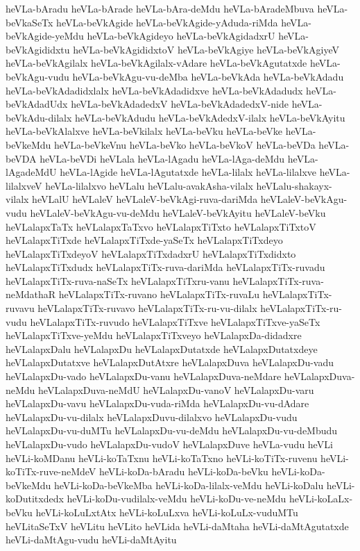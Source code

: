 {heVLa-bAradu
heVLa-bArade
heVLa-bAra-deMdu
heVLa-bAradeMbuva
heVLa-beVkaSeTx
heVLa-beVkAgide
heVLa-beVkAgide-yAduda-riMda
heVLa-beVkAgide-yeMdu
heVLa-beVkAgideyo
heVLa-beVkAgidadxrU
heVLa-beVkAgididxtu
heVLa-beVkAgididxtoV
heVLa-beVkAgiye
heVLa-beVkAgiyeV
heVLa-beVkAgilalx
heVLa-beVkAgilalx-vAdare
heVLa-beVkAgutatxde
heVLa-beVkAgu-vudu
heVLa-beVkAgu-vu-deMba
heVLa-beVkAda
heVLa-beVkAdadu
heVLa-beVkAdadidxlalx
heVLa-beVkAdadidxve
heVLa-beVkAdadudx
heVLa-beVkAdadUdx
heVLa-beVkAdadedxV
heVLa-beVkAdadedxV-nide
heVLa-beVkAdu-dilalx
heVLa-beVkAdudu
heVLa-beVkAdedxV-ilalx
heVLa-beVkAyitu
heVLa-beVkAlalxve
heVLa-beVkilalx
heVLa-beVku
heVLa-beVke
heVLa-beVkeMdu
heVLa-beVkeVnu
heVLa-beVko
heVLa-beVkoV
heVLa-beVDa
heVLa-beVDA
heVLa-beVDi
heVLala
heVLa-lAgadu
heVLa-lAga-deMdu
heVLa-lAgadeMdU
heVLa-lAgide
heVLa-lAgutatxde
heVLa-lilalx
heVLa-lilalxve
heVLa-lilalxveV
heVLa-lilalxvo
heVLalu
heVLalu-avakAsha-vilalx
heVLalu-shakayx-vilalx
heVLalU
heVLaleV
heVLaleV-beVkAgi-ruva-dariMda
heVLaleV-beVkAgu-vudu
heVLaleV-beVkAgu-vu-deMdu
heVLaleV-beVkAyitu
heVLaleV-beVku
heVLalapxTaTx
heVLalapxTaTxvo
heVLalapxTiTxto
heVLalapxTiTxtoV
heVLalapxTiTxde
heVLalapxTiTxde-yaSeTx
heVLalapxTiTxdeyo
heVLalapxTiTxdeyoV
heVLalapxTiTxdadxrU
heVLalapxTiTxdidxto
heVLalapxTiTxdudx
heVLalapxTiTx-ruva-dariMda
heVLalapxTiTx-ruvadu
heVLalapxTiTx-ruva-naSeTx
heVLalapxTiTxru-vanu
heVLalapxTiTx-ruva-neMdathaR
heVLalapxTiTx-ruvano
heVLalapxTiTx-ruvaLu
heVLalapxTiTx-ruvavu
heVLalapxTiTx-ruvavo
heVLalapxTiTx-ru-vu-dilalx
heVLalapxTiTx-ru-vudu
heVLalapxTiTx-ruvudo
heVLalapxTiTxve
heVLalapxTiTxve-yaSeTx
heVLalapxTiTxve-yeMdu
heVLalapxTiTxveyo
heVLalapxDa-didadxre
heVLalapxDalu
heVLalapxDu
heVLalapxDutatxde
heVLalapxDutatxdeye
heVLalapxDutatxve
heVLalapxDutAtxre
heVLalapxDuva
heVLalapxDu-vadu
heVLalapxDu-vado
heVLalapxDu-vanu
heVLalapxDuva-neMdare
heVLalapxDuva-neMdu
heVLalapxDuva-neMdU
heVLalapxDu-vanoV
heVLalapxDu-varu
heVLalapxDu-vavu
heVLalapxDu-vuda-riMda
heVLalapxDu-vu-dAdare
heVLalapxDu-vu-dilalx
heVLalapxDuvu-dilalxvo
heVLalapxDu-vudu
heVLalapxDu-vu-duMTu
heVLalapxDu-vu-deMdu
heVLalapxDu-vu-deMbudu
heVLalapxDu-vudo
heVLalapxDu-vudoV
heVLalapxDuve
heVLa-vudu
heVLi
heVLi-koMDanu
heVLi-koTaTxnu
heVLi-koTaTxno
heVLi-koTiTx-ruvenu
heVLi-koTiTx-ruve-neMdeV
heVLi-koDa-bAradu
heVLi-koDa-beVku
heVLi-koDa-beVkeMdu
heVLi-koDa-beVkeMba
heVLi-koDa-lilalx-veMdu
heVLi-koDalu
heVLi-koDutitxdedx
heVLi-koDu-vudilalx-veMdu
heVLi-koDu-ve-neMdu
heVLi-koLaLx-beVku
heVLi-koLuLxtAtx
heVLi-koLuLxva
heVLi-koLuLx-vuduMTu
heVLitaSeTxV
heVLitu
heVLito
heVLida
heVLi-daMtaha
heVLi-daMtAgutatxde
heVLi-daMtAgu-vudu
heVLi-daMtAyitu
}
